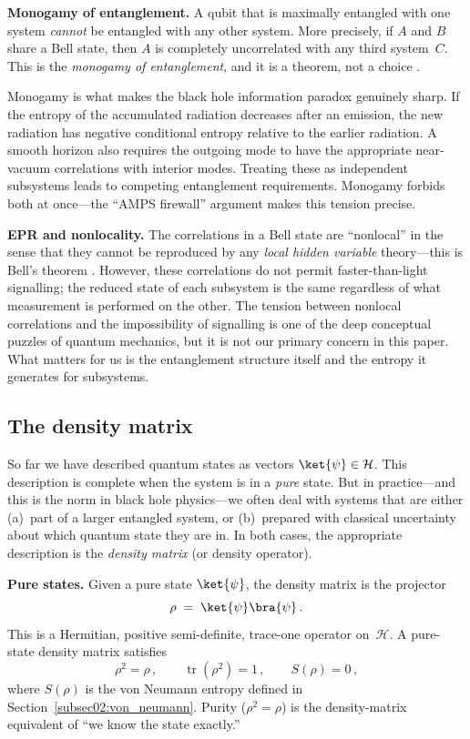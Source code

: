 \documentclass[11pt,letterpaper]{article}
\theoremstyle{plain}
\theoremstyle{definition}
\theoremstyle{remark}
\newcommand{\Hcal}{\mathcal{H}}
\DeclareMathOperator{\tr}{tr}
\begin{document}
\medskip
\noindent\textbf{Monogamy of entanglement.}
A qubit that is maximally entangled with one system \emph{cannot} be entangled with
any other system.  More precisely, if $A$ and $B$ share a Bell state, then $A$ is
completely uncorrelated with any third system~$C$.  This is the \emph{monogamy of
entanglement}, and it is a theorem, not a choice \cite{coffmanetal2000}.

Monogamy is what makes the black hole information paradox genuinely sharp.  If
the entropy of the accumulated radiation decreases after an emission, the
new radiation has negative conditional entropy relative to the earlier
radiation. A smooth horizon also requires the outgoing mode to have the
appropriate near-vacuum correlations with interior modes. Treating these
as independent subsystems leads to competing entanglement requirements.  Monogamy forbids both at once---the ``AMPS firewall''
argument \cite{ampsetal2013} makes this tension precise.

\medskip
\noindent\textbf{EPR and nonlocality.}
The correlations in a Bell state are ``nonlocal'' in the sense that they cannot be
reproduced by any \emph{local hidden variable} theory---this is Bell's theorem
\cite{bell1964}.  However, these correlations do not permit faster-than-light
signalling; the reduced state of each subsystem is the same regardless of what
measurement is performed on the other.  The tension between nonlocal correlations
and the impossibility of signalling is one of the deep conceptual puzzles of
quantum mechanics, but it is not our primary concern in this paper.  What matters
for us is the entanglement structure itself and the entropy it generates for
subsystems.

\subsection{The density matrix}
\label{subsec02:density_matrix}

So far we have described quantum states as vectors $\ket{\psi}\in\Hcal$.  This
description is complete when the system is in a \emph{pure} state.  But in
practice---and this is the norm in black hole physics---we often deal with systems
that are either (a)~part of a larger entangled system, or (b)~prepared with
classical uncertainty about which quantum state they are in.  In both cases, the
appropriate description is the \emph{density matrix} (or density operator).

\medskip
\noindent\textbf{Pure states.}
Given a pure state $\ket{\psi}$, the density matrix is the projector
\begin{equation}\label{eq02:pure_density}
  \rho \;=\; \ket{\psi}\bra{\psi}\,.
\end{equation}
This is a Hermitian, positive semi-definite, trace-one operator on~$\Hcal$.
A pure-state density matrix satisfies
\begin{equation}\label{eq02:pure_condition}
  \rho^2 = \rho\,,
  \qquad
  \tr(\rho^2) = 1\,,
  \qquad
  S(\rho) = 0\,,
\end{equation}
where $S(\rho)$ is the von Neumann entropy defined in
Section~\ref{subsec02:von_neumann}.  Purity ($\rho^2=\rho$) is the density-matrix
equivalent of ``we know the state exactly.''
\end{document}
